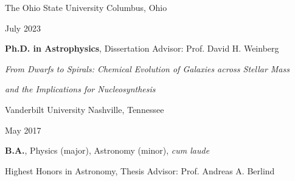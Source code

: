 \documentclass[cv.tex]{subfiles}
\begin{document}
{\color{themecolor}\large The Ohio State University}
\hfill
Columbus, Ohio
\par\noindent
\parbox{0.18\textwidth}{%
	\raggedleft
	July 2023 \par
	\null \par
	\null
}
\hspace{1mm}
\parbox{0.8\textwidth}{%
	\textbf{Ph.D. in Astrophysics}, Dissertation Advisor: Prof. David H. Weinberg
	\par
	\textit{From Dwarfs to Spirals: Chemical Evolution of
	Galaxies across Stellar Mass} \par
	\textit{and the Implications for Nucleosynthesis} \par
}

\vspace{3mm}
\noindent
{\color{themecolor}\large Vanderbilt University}
\hfill
Nashville, Tennessee
\par\noindent
\parbox{0.18\textwidth}{%
	\raggedleft
	May 2017 \par
	\null
}
\hspace{1mm}
\parbox{0.8\textwidth}{%
	\vspace{1mm}
	\textbf{B.A.}, Physics (major), Astronomy (minor), \textit{cum laude} \par
	Highest Honors in Astronomy, Thesis Advisor: Prof. Andreas A. Berlind
}
\end{document}
